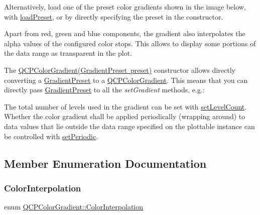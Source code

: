Alternatively, load one of the preset color gradients shown in the image below, with \mbox{\hyperlink{class_q_c_p_color_gradient_aa0aeec1528241728b9671bf8e60b1622}{load\+Preset}}, or by directly specifying the preset in the constructor.

Apart from red, green and blue components, the gradient also interpolates the alpha values of the configured color stops. This allows to display some portions of the data range as transparent in the plot.



The \mbox{\hyperlink{class_q_c_p_color_gradient_a4e570b4004fd60bd135e52d685ed2b66}{Q\+C\+P\+Color\+Gradient(\+Gradient\+Preset preset)}} constructor allows directly converting a \mbox{\hyperlink{class_q_c_p_color_gradient_aed6569828fee337023670272910c9072}{Gradient\+Preset}} to a \mbox{\hyperlink{class_q_c_p_color_gradient}{Q\+C\+P\+Color\+Gradient}}. This means that you can directly pass \mbox{\hyperlink{class_q_c_p_color_gradient_aed6569828fee337023670272910c9072}{Gradient\+Preset}} to all the {\itshape set\+Gradient} methods, e.\+g.\+: 
\begin{DoxyCodeInclude}{0}
\end{DoxyCodeInclude}
 The total number of levels used in the gradient can be set with \mbox{\hyperlink{class_q_c_p_color_gradient_a18da587eb4f7fc788ea28ba15b6a12de}{set\+Level\+Count}}. Whether the color gradient shall be applied periodically (wrapping around) to data values that lie outside the data range specified on the plottable instance can be controlled with \mbox{\hyperlink{class_q_c_p_color_gradient_a39d6448155fc00a219f239220d14bb39}{set\+Periodic}}. 

\subsection{Member Enumeration Documentation}
\mbox{\label{class_q_c_p_color_gradient_ac5dca17cc24336e6ca176610e7f77fc1}} 
\subsubsection{\texorpdfstring{ColorInterpolation}{ColorInterpolation}}
{\footnotesize\ttfamily enum \mbox{\hyperlink{class_q_c_p_color_gradient_ac5dca17cc24336e6ca176610e7f77fc1}{Q\+C\+P\+Color\+Gradient\+::\+Color\+Interpolation}}}

